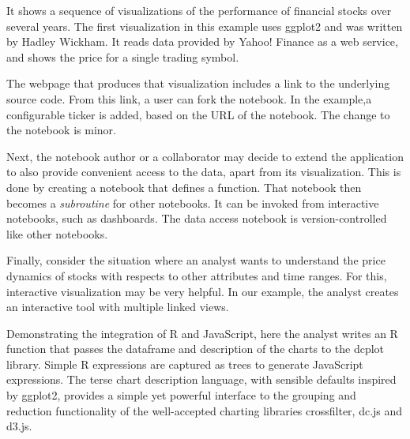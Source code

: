 It shows a sequence of visualizations of the performance
of financial stocks over several years. The first visualization
in this example uses ggplot2 and was written by Hadley Wickham.
It reads data provided by Yahoo! Finance as a web service, and shows
the price for a single trading symbol.

The webpage that produces that visualization includes a link to
the underlying source code. From this link, a user can fork the notebook.
In the example,a configurable ticker is added, based on the URL of
the notebook. The change to the notebook is minor.

Next, the notebook author or a collaborator may decide to extend
the application to also provide convenient access to the data,
apart from its visualization.
This is done by creating a notebook that defines a function.
That notebook then becomes a \emph{subroutine} for other notebooks.
It can be invoked from interactive notebooks, such as dashboards.
The data access notebook is version-controlled like other notebooks.

Finally, consider the situation where an analyst wants to understand
the price dynamics of stocks with respects to other attributes and
time ranges. For this, interactive visualization may be very helpful.
In our example, the analyst creates an interactive tool with multiple
linked views.

Demonstrating the integration of R and JavaScript, here the analyst
writes an R function that passes the dataframe and description of
the charts to the dcplot library.  Simple R expressions
are captured as trees to generate JavaScript expressions.
The terse chart description language, with sensible defaults inspired by
ggplot2, provides a simple yet powerful interface to the grouping
and reduction functionality of the well-accepted charting libraries
crossfilter, dc.js and d3.js.


%
